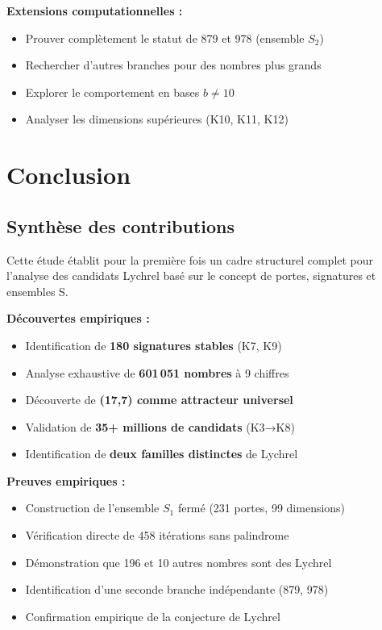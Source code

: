 \documentclass[12pt,a4paper]{article}
\theoremstyle{remark}
\begin{document}
\textbf{Extensions computationnelles :}
\begin{itemize}
\item Prouver complètement le statut de 879 et 978 (ensemble $S_2$)
\item Rechercher d'autres branches pour des nombres plus grands
\item Explorer le comportement en bases $b \neq 10$
\item Analyser les dimensions supérieures (K10, K11, K12)
\end{itemize}


\section{Conclusion}
\label{sec:conclusion}

\subsection{Synthèse des contributions}

Cette étude établit pour la première fois un cadre structurel complet pour l'analyse des candidats Lychrel basé sur le concept de portes, signatures et ensembles S.

\textbf{Découvertes empiriques :}
\begin{itemize}
\item Identification de \textbf{180 signatures stables} (K7, K9)
\item Analyse exhaustive de \textbf{601\,051 nombres} à 9 chiffres
\item Découverte de \textbf{(17,7) comme attracteur universel}
\item Validation de \textbf{35+ millions de candidats} (K3→K8)
\item Identification de \textbf{deux familles distinctes} de Lychrel
\end{itemize}

\textbf{Preuves empiriques :}
\begin{itemize}
\item Construction de l'ensemble $S_1$ fermé (231 portes, 99 dimensions)
\item Vérification directe de 458 itérations sans palindrome
\item Démonstration que 196 et 10 autres nombres sont des Lychrel
\item Identification d'une seconde branche indépendante (879, 978)
\item Confirmation empirique de la conjecture de Lychrel
\end{itemize}
\end{document}
